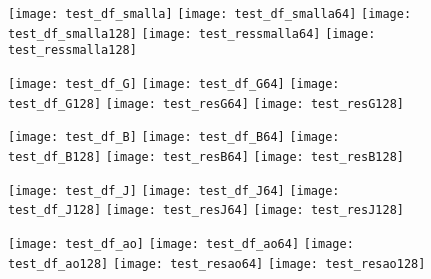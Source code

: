 \begin{figure}[H]
  \texttt{[image: test\_df\_smalla]}
\endminipage\hfill
{}
  \texttt{[image: test\_df\_smalla64]}
\endminipage\hfill
{}
  \texttt{[image: test\_df\_smalla128]}
\endminipage\hfill
{}
  \texttt{[image: test\_ressmalla64]}
\endminipage\hfill
{}
  \texttt{[image: test\_ressmalla128]}
\endminipage\hfill
\end{figure}

\begin{figure}[H]
  \texttt{[image: test\_df\_G]}
\endminipage\hfill
{}
  \texttt{[image: test\_df\_G64]}
\endminipage\hfill
{}
  \texttt{[image: test\_df\_G128]}
\endminipage\hfill
{}
  \texttt{[image: test\_resG64]}
\endminipage\hfill
{}
  \texttt{[image: test\_resG128]}
\endminipage\hfill
\end{figure}

\begin{figure}[H]
  \texttt{[image: test\_df\_B]}
\endminipage\hfill
{}
  \texttt{[image: test\_df\_B64]}
\endminipage\hfill
{}
  \texttt{[image: test\_df\_B128]}
\endminipage\hfill
{}
  \texttt{[image: test\_resB64]}
\endminipage\hfill
{}
  \texttt{[image: test\_resB128]}
\endminipage\hfill
\end{figure}

\begin{figure}[H]
  \texttt{[image: test\_df\_J]}
\endminipage\hfill
{}
  \texttt{[image: test\_df\_J64]}
\endminipage\hfill
{}
  \texttt{[image: test\_df\_J128]}
\endminipage\hfill
{}
  \texttt{[image: test\_resJ64]}
\endminipage\hfill
{}
  \texttt{[image: test\_resJ128]}
\endminipage\hfill
\end{figure}

\begin{figure}[H]
  \texttt{[image: test\_df\_ao]}
\endminipage\hfill
{}
  \texttt{[image: test\_df\_ao64]}
\endminipage\hfill
{}
  \texttt{[image: test\_df\_ao128]}
\endminipage\hfill
{}
  \texttt{[image: test\_resao64]}
\endminipage\hfill
{}
  \texttt{[image: test\_resao128]}
\endminipage\hfill
\end{figure}


